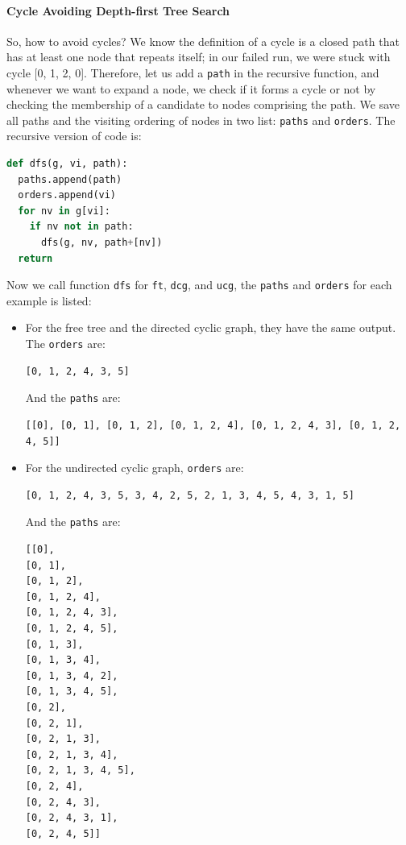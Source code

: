 \documentclass[main.tex]{subfiles}
\begin{document}
\paragraph{Cycle Avoiding Depth-first Tree Search} 
So, how to avoid cycles? We know the definition of a cycle is a closed path that has  at least one node that repeats itself; in our failed run, we were stuck with cycle [0, 1, 2, 0]. Therefore, let us add a \texttt{path} in the recursive function, and whenever we want to expand a node, we check if it forms a cycle or not by checking the membership of a candidate to nodes comprising the path.  We save all paths and the visiting ordering of nodes in two list: \texttt{paths} and \texttt{orders}. The recursive version of code is:
\begin{lstlisting}[language=Python]
def dfs(g, vi, path):
  paths.append(path)
  orders.append(vi)
  for nv in g[vi]:  
    if nv not in path: 
      dfs(g, nv, path+[nv])
  return 
\end{lstlisting}
Now we call function \texttt{dfs} for \texttt{ft}, \texttt{dcg}, and \texttt{ucg}, the \texttt{paths} and \texttt{orders} for each example is listed:
\begin{itemize}
    \item For the free tree and the directed cyclic graph, they have the same output. The \texttt{orders} are:
\begin{lstlisting}[numbers=none]
[0, 1, 2, 4, 3, 5]
\end{lstlisting}
    And the \texttt{paths} are:
\begin{lstlisting}[numbers=none]
[[0], [0, 1], [0, 1, 2], [0, 1, 2, 4], [0, 1, 2, 4, 3], [0, 1, 2, 4, 5]]
\end{lstlisting}
    \item For the undirected cyclic graph, \texttt{orders} are:
\begin{lstlisting}[numbers=none]
[0, 1, 2, 4, 3, 5, 3, 4, 2, 5, 2, 1, 3, 4, 5, 4, 3, 1, 5]
\end{lstlisting}
    And the \texttt{paths} are:
\begin{lstlisting}[numbers=none]
[[0],
[0, 1],
[0, 1, 2],
[0, 1, 2, 4],
[0, 1, 2, 4, 3],
[0, 1, 2, 4, 5],
[0, 1, 3],
[0, 1, 3, 4],
[0, 1, 3, 4, 2],
[0, 1, 3, 4, 5],
[0, 2],
[0, 2, 1],
[0, 2, 1, 3],
[0, 2, 1, 3, 4],
[0, 2, 1, 3, 4, 5],
[0, 2, 4],
[0, 2, 4, 3],
[0, 2, 4, 3, 1],
[0, 2, 4, 5]]
\end{lstlisting}
\end{itemize}
\end{document}
